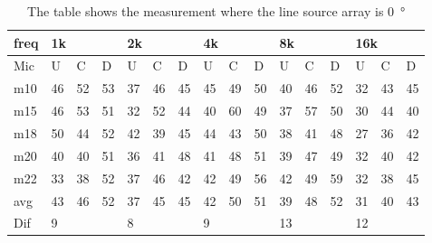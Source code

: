 \begin{table}[H]
\centering
\caption{The table shows the measurement where the line source array is \SI{0}{\degree}}
\begin{tabular}{l|l|l|l|l|l|l|l|l|l|l|l|l|lll}
freq & \multicolumn{3}{l|}{1k} & \multicolumn{3}{l|}{2k} & \multicolumn{3}{l|}{4k} & \multicolumn{3}{l|}{8k} & \multicolumn{3}{l}{16k}                                \\ \hline
Mic  & U      & C      & D     & U      & C      & D     & U      & C      & D     & U      & C      & D     & \multicolumn{1}{l|}{U}  & \multicolumn{1}{l|}{C}  & D  \\ \hline
m10  & 46     & 52     & 53    & 37     & 46     & 45    & 45     & 49     & 50    & 40     & 46     & 52    & \multicolumn{1}{l|}{32} & \multicolumn{1}{l|}{43} & 45 \\
m15  & 46     & 53     & 51    & 32     & 52     & 44    & 40     & 60     & 49    & 37     & 57     & 50    & \multicolumn{1}{l|}{30} & \multicolumn{1}{l|}{44} & 40 \\
m18  & 50     & 44     & 52    & 42     & 39     & 45    & 44     & 43     & 50    & 38     & 41     & 48    & \multicolumn{1}{l|}{27} & \multicolumn{1}{l|}{36} & 42 \\
m20  & 40     & 40     & 51    & 36     & 41     & 48    & 41     & 48     & 51    & 39     & 47     & 49    & \multicolumn{1}{l|}{32} & \multicolumn{1}{l|}{40} & 42 \\
m22  & 33     & 38     & 52    & 37     & 46     & 42    & 42     & 49     & 56    & 42     & 49     & 59    & \multicolumn{1}{l|}{32} & \multicolumn{1}{l|}{38} & 45 \\ \hline
avg  &  43     &  46   &  52    &  37    & 45     & 45    &  42    &  50    &  51   &  39    &  48    & 52    & \multicolumn{1}{l|}{31}   & \multicolumn{1}{l|}{40}   &  43 \\ \hline  
Dif & \multicolumn{3}{l|}{9} & \multicolumn{3}{l|}{8} & \multicolumn{3}{l|}{9} & \multicolumn{3}{l|}{13} & \multicolumn{3}{l}{12}                                
\end{tabular}
\end{table}

